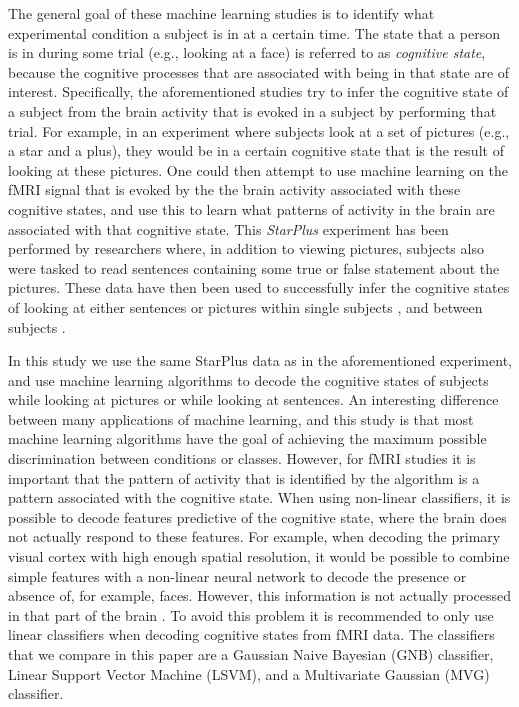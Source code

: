 \documentclass[preprint,journal,11pt]{vgtc}
\begin{document}
The general goal of these machine learning studies is to identify what experimental condition a subject is in at a certain time. The state that a person is in during some trial (e.g., looking at a face) is referred to as \emph{cognitive state}, because the cognitive processes that are associated with being in that state are of interest. Specifically, the aforementioned studies try to infer the cognitive state of a subject from the brain activity that is evoked in a subject by performing that trial. For example, in an experiment where subjects look at a set of pictures (e.g., a star and a plus), they would be in a certain cognitive state that is the result of looking at these pictures. One could then attempt to use machine learning on the fMRI signal that is evoked by the the brain activity associated with these cognitive states, and use this to learn what patterns of activity in the brain are associated with that cognitive state. This \emph{StarPlus} experiment has been performed by researchers where, in addition to viewing pictures, subjects also were tasked to read sentences containing some true or false statement about the pictures. These data have then been used to successfully infer the cognitive states of looking at either sentences or pictures within single subjects \cite{mi:2003within}, and between subjects \cite{wa:2003betw}.

In this study we use the same StarPlus data as in the aforementioned experiment, and use machine learning algorithms to decode the cognitive states of subjects while looking at pictures or while looking at sentences. An interesting difference between many applications of machine learning, and this study is that most machine learning algorithms have the goal of achieving the maximum possible discrimination between conditions or classes. However, for fMRI studies it is important that the pattern of activity that is identified by the algorithm is a pattern associated with the cognitive state. When using non-linear classifiers, it is possible to decode features predictive of the cognitive state, where the brain does not actually respond to these features. For example, when decoding the primary visual cortex with high enough spatial resolution, it would be possible to combine simple features with a non-linear neural network to decode the presence or absence of, for example, faces. However, this information is not actually processed in that part of the brain \cite{to:2012rev}. To avoid this problem it is recommended to only use linear classifiers when decoding cognitive states from fMRI data. The classifiers that we compare in this paper are a Gaussian Naive Bayesian (GNB) classifier, Linear Support Vector Machine (LSVM), and a Multivariate Gaussian (MVG) classifier.
\end{document}
